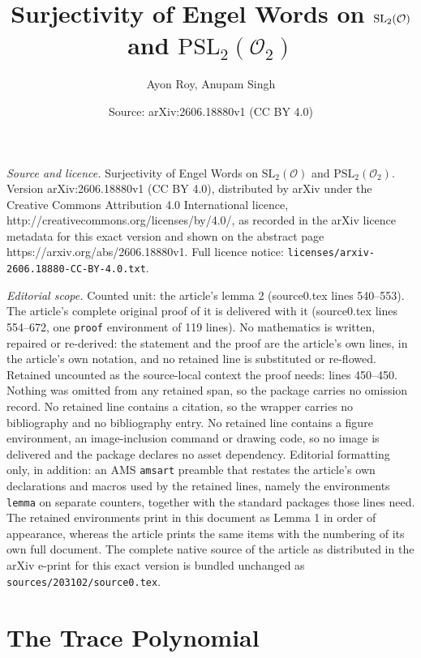 \documentclass[10pt,a4paper]{amsart}
\title{Surjectivity of Engel Words on $\SL_2(\mathcal{O})$ and $\mathrm{PSL}_2(\mathcal{O}_2)$}
\author{Ayon Roy, Anupam Singh}
\date{Source: arXiv:2606.18880v1 (CC BY 4.0)}
\newcommand{\SL}{\mathrm{SL}}
\begin{document}
\maketitle

\noindent\emph{Source and licence.} Surjectivity of Engel Words on $\SL_2(\mathcal{O})$ and $\mathrm{PSL}_2(\mathcal{O}_2)$. Version arXiv:2606.18880v1 (CC BY 4.0), distributed by arXiv under the Creative Commons Attribution 4.0 International licence, http://creativecommons.org/licenses/by/4.0/, as recorded in the arXiv licence metadata for this exact version and shown on the abstract page https://arxiv.org/abs/2606.18880v1. Full licence notice: \texttt{licenses/arxiv-2606.18880-CC-BY-4.0.txt}.\par\smallskip

\noindent\textit{Editorial scope.} Counted unit: the article's lemma 2 (source0.tex lines 540--553). The article's complete original proof of it is delivered with it (source0.tex lines 554--672, one \texttt{proof} environment of 119 lines). No mathematics is written, repaired or re-derived: the statement and the proof are the article's own lines, in the article's own notation, and no retained line is substituted or re-flowed.  Retained uncounted as the source-local context the proof needs: lines 450--450.  Nothing was omitted from any retained span, so the package carries no omission record.  No retained line contains a citation, so the wrapper carries no bibliography and no bibliography entry.  No retained line contains a figure environment, an image-inclusion command or drawing code, so no image is delivered and the package declares no asset dependency.  Editorial formatting only, in addition: an AMS \texttt{amsart} preamble that restates the article's own declarations and macros used by the retained lines, namely the environments \texttt{lemma} on separate counters, together with the standard packages those lines need.  The retained environments print in this document as Lemma 1 in order of appearance, whereas the article prints the same items with the numbering of its own full document.  The complete native source of the article as distributed in the arXiv e-print for this exact version is bundled unchanged as \texttt{sources/203102/source0.tex}.
\section{The Trace Polynomial}{\label{tr}}
\end{document}

